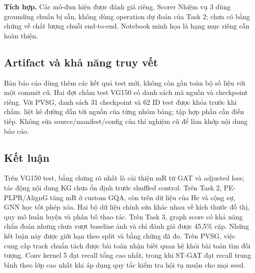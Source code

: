 \textbf{Tích hợp.} Các mô-đun hiện được đánh giá riêng. Scorer Nhiệm vụ 3 dùng
grounding chuẩn bị sẵn, không dùng operation dự đoán của Task 2; chưa có bằng chứng
về chất lượng chuỗi end-to-end. Notebook minh họa là hạng mục riêng cần hoàn thiện.

\subsection{Artifact và khả năng truy vết}
Bản báo cáo dùng thêm các kết quả test mới, không còn gắn toàn bộ số liệu với
một commit cũ. Hai đợt chấm test VG150 có danh sách mã nguồn và checkpoint riêng. Với PVSG, danh sách 31 checkpoint và 62 ID test được khóa trước khi chấm.  liệt kê đường
dẫn tới nguồn của từng nhóm bảng;  tập hợp phần cần điền tiếp.
Không sửa source/manifest/config của thí nghiệm cũ để làm khớp nội dung báo cáo.


\subsection{Kết luận}
Trên VG150 test, bằng chứng rõ nhất là cải thiện mR từ GAT và adjusted loss;
tác động nội dung KG chưa ổn định trước shuffled control. Trên Task 2,
PE-PLPR/AlignG tăng mR ở custom GQA, còn trên dữ liệu của He và cộng sự,
GNN học tốt phép xóa. Hai bộ dữ liệu chỉnh sửa khác nhau về kích thước đồ thị,
quy mô huấn luyện và phân bố thao tác.
Trên Task 3, graph score có khả năng chẩn đoán nhưng chưa vượt baseline ảnh
và chỉ đánh giá được 45,5\% cặp. Những kết luận này được giới hạn theo
split và bằng chứng đã đo. Trên PVSG, việc cung cấp track chuẩn tách được
bài toán nhận biết quan hệ khỏi bài toán tìm đối tượng. Conv kernel 5 đạt recall
tổng cao nhất, trong khi ST-GAT đạt recall trung bình theo lớp cao nhất khi áp dụng
quy tắc kiểm tra hội tụ muộn cho mọi seed.
